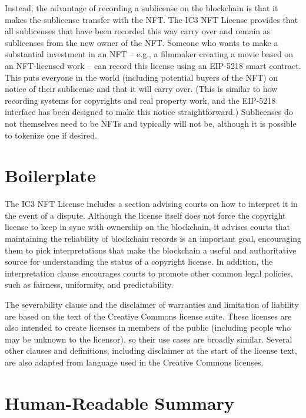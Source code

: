 \documentclass{article}
\newcommand{\eiplicense}{EIP-5218\xspace}
\newcommand{\iccclicense}{IC3 NFT License\xspace}
\begin{document}
Instead, the advantage of recording a sublicense on the blockchain is that it makes the sublicense transfer with the NFT. The \iccclicense provides that all sublicenses that have been recorded this way carry over and remain as sublicenses from the new owner of the NFT. Someone who wants to make a substantial investment in an NFT -- e.g., a filmmaker creating a movie based on an NFT-licensed work -- can record this license using an \eiplicense smart contract. This puts everyone in the world (including potential buyers of the NFT) on notice of their sublicense and that it will carry over. (This is similar to how recording systems for copyrights and real property work, and the \eiplicense interface has been designed to make this notice straightforward.)  Sublicenses do not themselves need to be NFTs and typically will not be, although it is possible to tokenize one if desired.



\section{Boilerplate}

The \iccclicense includes a section advising courts on how to interpret it in the event of a dispute. Although the license itself does not force the copyright license to keep in sync with ownership on the blockchain, it advises courts that maintaining the reliability of blockchain records is an important goal, encouraging them to pick interpretations that make the blockchain a useful and authoritative source for understanding the status of a copyright license. In addition, the interpretation clause encourages courts to promote other common legal policies, such as fairness, uniformity, and predictability.

The severability clause and the disclaimer of warranties and limitation of liability are based on the text of the Creative Commons license suite. These licenses are also intended to create licenses in members of the public (including people who may be unknown to the licensor), so their use cases are broadly similar. Several other clauses and definitions, including disclaimer at the start of the license text, are also adapted from language used in the Creative Commons licenses.

\appendix

\section{Human-Readable Summary}
\label{sec:human}
\end{document}
